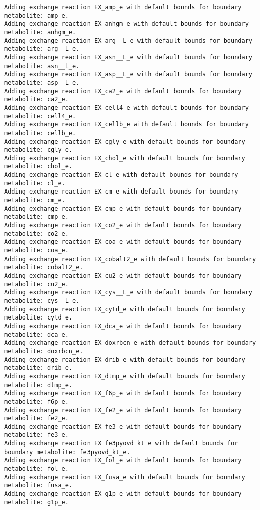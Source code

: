 \documentclass[
  letterpaper,
  DIV=11,
  numbers=noendperiod]{scrartcl}
\begin{document}
\begin{verbatim}
Adding exchange reaction EX_amp_e with default bounds for boundary metabolite: amp_e.
Adding exchange reaction EX_anhgm_e with default bounds for boundary metabolite: anhgm_e.
Adding exchange reaction EX_arg__L_e with default bounds for boundary metabolite: arg__L_e.
Adding exchange reaction EX_asn__L_e with default bounds for boundary metabolite: asn__L_e.
Adding exchange reaction EX_asp__L_e with default bounds for boundary metabolite: asp__L_e.
Adding exchange reaction EX_ca2_e with default bounds for boundary metabolite: ca2_e.
Adding exchange reaction EX_cell4_e with default bounds for boundary metabolite: cell4_e.
Adding exchange reaction EX_cellb_e with default bounds for boundary metabolite: cellb_e.
Adding exchange reaction EX_cgly_e with default bounds for boundary metabolite: cgly_e.
Adding exchange reaction EX_chol_e with default bounds for boundary metabolite: chol_e.
Adding exchange reaction EX_cl_e with default bounds for boundary metabolite: cl_e.
Adding exchange reaction EX_cm_e with default bounds for boundary metabolite: cm_e.
Adding exchange reaction EX_cmp_e with default bounds for boundary metabolite: cmp_e.
Adding exchange reaction EX_co2_e with default bounds for boundary metabolite: co2_e.
Adding exchange reaction EX_coa_e with default bounds for boundary metabolite: coa_e.
Adding exchange reaction EX_cobalt2_e with default bounds for boundary metabolite: cobalt2_e.
Adding exchange reaction EX_cu2_e with default bounds for boundary metabolite: cu2_e.
Adding exchange reaction EX_cys__L_e with default bounds for boundary metabolite: cys__L_e.
Adding exchange reaction EX_cytd_e with default bounds for boundary metabolite: cytd_e.
Adding exchange reaction EX_dca_e with default bounds for boundary metabolite: dca_e.
Adding exchange reaction EX_doxrbcn_e with default bounds for boundary metabolite: doxrbcn_e.
Adding exchange reaction EX_drib_e with default bounds for boundary metabolite: drib_e.
Adding exchange reaction EX_dtmp_e with default bounds for boundary metabolite: dtmp_e.
Adding exchange reaction EX_f6p_e with default bounds for boundary metabolite: f6p_e.
Adding exchange reaction EX_fe2_e with default bounds for boundary metabolite: fe2_e.
Adding exchange reaction EX_fe3_e with default bounds for boundary metabolite: fe3_e.
Adding exchange reaction EX_fe3pyovd_kt_e with default bounds for boundary metabolite: fe3pyovd_kt_e.
Adding exchange reaction EX_fol_e with default bounds for boundary metabolite: fol_e.
Adding exchange reaction EX_fusa_e with default bounds for boundary metabolite: fusa_e.
Adding exchange reaction EX_g1p_e with default bounds for boundary metabolite: g1p_e.

\end{verbatim}
\end{document}
